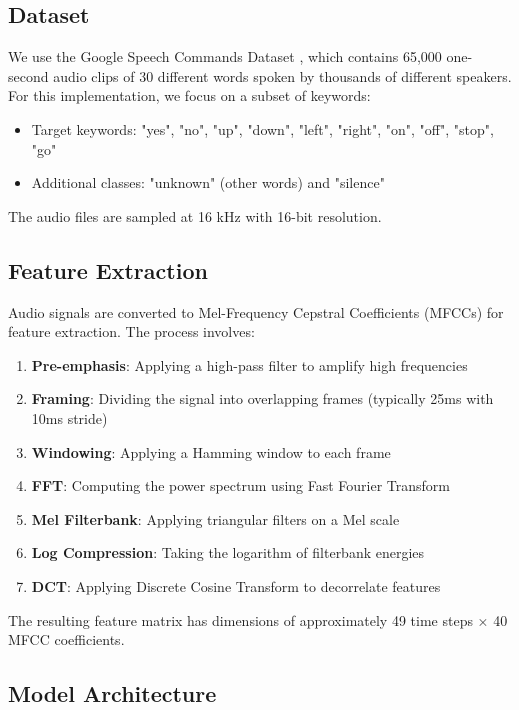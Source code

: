 \documentclass[12pt,a4paper]{article}
\begin{document}
\subsection{Dataset}

We use the Google Speech Commands Dataset \cite{speechcommands}, which contains 65,000 one-second audio clips of 30 different words spoken by thousands of different speakers. For this implementation, we focus on a subset of keywords:

\begin{itemize}
    \item Target keywords: "yes", "no", "up", "down", "left", "right", "on", "off", "stop", "go"
    \item Additional classes: "unknown" (other words) and "silence"
\end{itemize}

The audio files are sampled at 16 kHz with 16-bit resolution.

\subsection{Feature Extraction}

Audio signals are converted to Mel-Frequency Cepstral Coefficients (MFCCs) for feature extraction. The process involves:

\begin{enumerate}
    \item \textbf{Pre-emphasis}: Applying a high-pass filter to amplify high frequencies
    \item \textbf{Framing}: Dividing the signal into overlapping frames (typically 25ms with 10ms stride)
    \item \textbf{Windowing}: Applying a Hamming window to each frame
    \item \textbf{FFT}: Computing the power spectrum using Fast Fourier Transform
    \item \textbf{Mel Filterbank}: Applying triangular filters on a Mel scale
    \item \textbf{Log Compression}: Taking the logarithm of filterbank energies
    \item \textbf{DCT}: Applying Discrete Cosine Transform to decorrelate features
\end{enumerate}

The resulting feature matrix has dimensions of approximately 49 time steps × 40 MFCC coefficients.

\subsection{Model Architecture}
\end{document}
